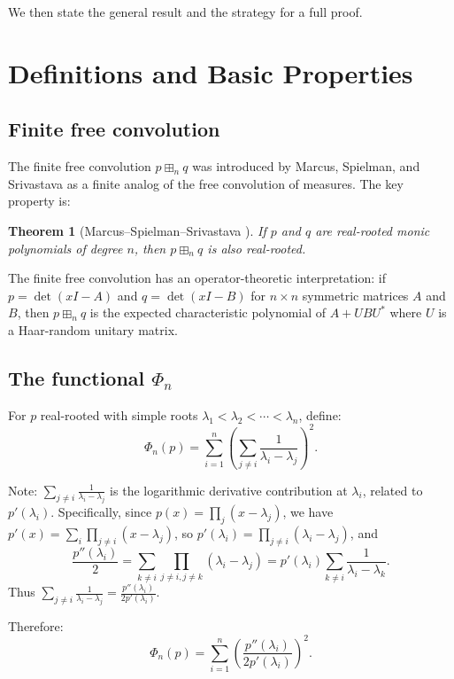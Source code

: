 \documentclass[12pt]{article}
\newtheorem{theorem}{Theorem}
\begin{document}
We then state the general result and the strategy for a full proof.

\section{Definitions and Basic Properties}

\subsection{Finite free convolution}

The finite free convolution $p \boxplus_n q$ was introduced by Marcus, Spielman, and Srivastava \cite{MSS2015} as a finite analog of the free convolution of measures. The key property is:

\begin{theorem}[Marcus--Spielman--Srivastava \cite{MSS2015}]\label{thm:MSS}
If $p$ and $q$ are real-rooted monic polynomials of degree $n$, then $p \boxplus_n q$ is also real-rooted.
\end{theorem}

The finite free convolution has an operator-theoretic interpretation: if $p = \det(xI - A)$ and $q = \det(xI - B)$ for $n \times n$ symmetric matrices $A$ and $B$, then $p \boxplus_n q$ is the expected characteristic polynomial of $A + UBU^*$ where $U$ is a Haar-random unitary matrix.

\subsection{The functional $\Phi_n$}

For $p$ real-rooted with simple roots $\lambda_1 < \lambda_2 < \cdots < \lambda_n$, define:
\[
\Phi_n(p) = \sum_{i=1}^n \left(\sum_{j \neq i} \frac{1}{\lambda_i - \lambda_j}\right)^2.
\]

Note: $\sum_{j \neq i} \frac{1}{\lambda_i - \lambda_j}$ is the logarithmic derivative contribution at $\lambda_i$, related to $p'(\lambda_i)$. Specifically, since $p(x) = \prod_j(x-\lambda_j)$, we have $p'(x) = \sum_i \prod_{j\neq i}(x - \lambda_j)$, so $p'(\lambda_i) = \prod_{j\neq i}(\lambda_i - \lambda_j)$, and
\[
\frac{p''(\lambda_i)}{2} = \sum_{k \neq i} \prod_{j \neq i, j \neq k} (\lambda_i - \lambda_j) = p'(\lambda_i) \sum_{k \neq i} \frac{1}{\lambda_i - \lambda_k}.
\]
Thus $\sum_{j \neq i} \frac{1}{\lambda_i - \lambda_j} = \frac{p''(\lambda_i)}{2p'(\lambda_i)}$.

Therefore:
\begin{equation}\label{eq:phi-formula}
\Phi_n(p) = \sum_{i=1}^n \left(\frac{p''(\lambda_i)}{2p'(\lambda_i)}\right)^2.
\end{equation}
\end{document}
